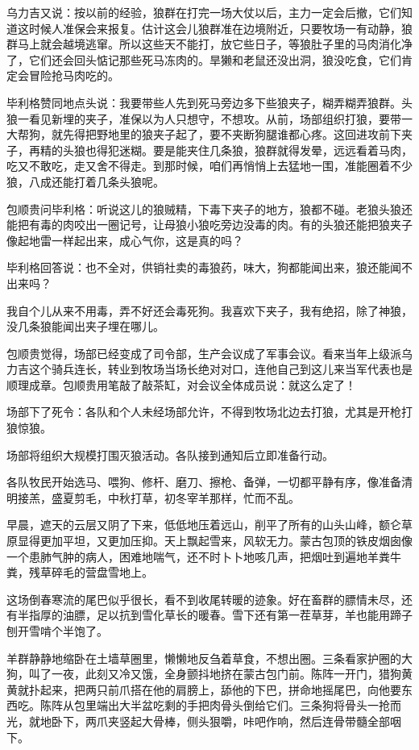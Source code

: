 \par 乌力吉又说：按以前的经验，狼群在打完一场大仗以后，主力一定会后撤，它们知道这时候人准保会来报复。估计这会儿狼群准在边境附近，只要牧场一有动静，狼群马上就会越境逃窜。所以这些天不能打，放它些日子，等狼肚子里的马肉消化净了，它们还会回头惦记那些死马冻肉的。旱獭和老鼠还没出洞，狼没吃食，它们肯定会冒险抢马肉吃的。
\par 毕利格赞同地点头说：我要带些人先到死马旁边多下些狼夹子，糊弄糊弄狼群。头狼一看见新埋的夹子，准保以为人只想守，不想攻。从前，场部组织打狼，要带一大帮狗，就先得把野地里的狼夹子起了，要不夹断狗腿谁都心疼。这回进攻前下夹子，再精的头狼也得犯迷糊。要是能夹住几条狼，狼群就得发晕，远远看着马肉，吃又不敢吃，走又舍不得走。到那时候，咱们再悄悄上去猛地一围，准能圈着不少狼，八成还能打着几条头狼呢。
\par 包顺贵问毕利格：听说这儿的狼贼精，下毒下夹子的地方，狼都不碰。老狼头狼还能把有毒的肉咬出一圈记号，让母狼小狼吃旁边没毒的肉。有的头狼还能把狼夹子像起地雷一样起出来，成心气你，这是真的吗？
\par 毕利格回答说：也不全对，供销社卖的毒狼药，味大，狗都能闻出来，狼还能闻不出来吗？
\par 我自个儿从来不用毒，弄不好还会毒死狗。我喜欢下夹子，我有绝招，除了神狼，没几条狼能闻出夹子埋在哪儿。
\par 包顺贵觉得，场部已经变成了司令部，生产会议成了军事会议。看来当年上级派乌力吉这个骑兵连长，转业到牧场当场长绝对对口，连他自己到这儿来当军代表也是顺理成章。包顺贵用笔敲了敲茶缸，对会议全体成员说：就这么定了！
\par 场部下了死令：各队和个人未经场部允许，不得到牧场北边去打狼，尤其是开枪打狼惊狼。
\par 场部将组织大规模打围灭狼活动。各队接到通知后立即准备行动。
\par 各队牧民开始选马、喂狗、修杆、磨刀、擦枪、备弹，一切都平静有序，像准备清明接羔，盛夏剪毛，中秋打草，初冬宰羊那样，忙而不乱。
\par 
\par 早晨，遮天的云层又阴了下来，低低地压着远山，削平了所有的山头山峰，额仑草原显得更加平坦，又更加压抑。天上飘起雪来，风软无力。蒙古包顶的铁皮烟囱像一个患肺气肿的病人，困难地喘气，还不时卜卜地咳几声，把烟吐到遍地羊粪牛粪，残草碎毛的营盘雪地上。
\par 这场倒春寒流的尾巴似乎很长，看不到收尾转暖的迹象。好在畜群的膘情未尽，还有半指厚的油膘，足以抗到雪化草长的暖春。雪下还有第一茬草芽，羊也能用蹄子刨开雪啃个半饱了。
\par 羊群静静地缩卧在土墙草圈里，懒懒地反刍着草食，不想出圈。三条看家护圈的大狗，叫了一夜，此刻又冷又饿，全身颤抖地挤在蒙古包门前。陈阵一开门，猎狗黄黄就扑起来，把两只前爪搭在他的肩膀上，舔他的下巴，拼命地摇尾巴，向他要东西吃。陈阵从包里端出大半盆吃剩的手把肉骨头倒给它们。三条狗将骨头一抢而光，就地卧下，两爪夹竖起大骨棒，侧头狠嚼，咔吧作响，然后连骨带髓全部咽下。

